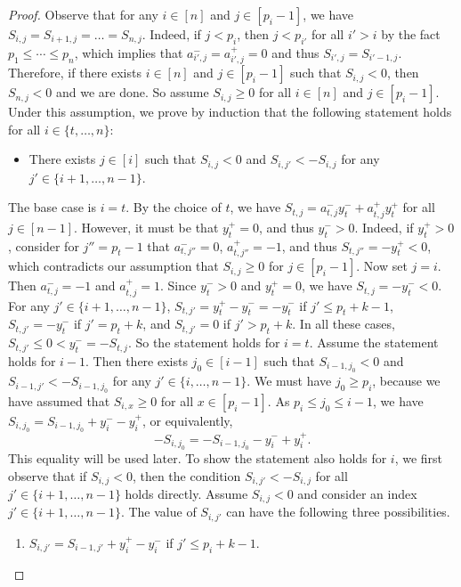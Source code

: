 \documentclass[english]{lipics-v2021}
\begin{document}
\begin{proof}
Observe that for any $i \in [n]$ and $j \in [p_i-1]$, we have $S_{i,j} = S_{i+1,j} = \dots = S_{n,j}$.
Indeed, if $j < p_i$, then $j < p_{i'}$ for all $i' > i$ by the fact $p_1 \leq \cdots \leq p_n$, which implies that $a_{i',j}^- = a_{i',j}^+ = 0$ and thus $S_{i',j} = S_{i'-1,j}$.
Therefore, if there exists $i \in [n]$ and $j \in [p_i-1]$ such that $S_{i,j} < 0$, then $S_{n,j} < 0$ and we are done.
So assume $S_{i,j} \geq 0$ for all $i \in [n]$ and $j \in [p_i-1]$.
Under this assumption, we prove by induction that the following statement holds for all $i \in \{t,\dots,n\}$:
\begin{itemize}
    \item There exists $j \in [i]$ such that $S_{i,j} < 0$ and $S_{i,j'} < - S_{i,j}$ for any $j' \in \{i+1,\dots,n-1\}$.
\end{itemize}
The base case is $i = t$.
By the choice of $t$, we have $S_{t,j} = a_{t,j}^- y_t^- + a_{t,j}^+ y_t^+$ for all $j \in [n-1]$.
However, it must be that $y_t^+ = 0$, and thus $y_t^- > 0$.
Indeed, if $y_t^+ > 0$, consider for $j'' = p_t-1$ that $a_{t,j''}^- = 0$, $a_{t,j''}^+ = -1$, and thus $S_{t,j''} = -y_t^+ < 0$, which contradicts our assumption that $S_{i,j} \geq 0$ for $j \in [p_i - 1]$.
Now set $j = i$.
Then $a_{t,j}^- = -1$ and $a_{t,j}^+ = 1$.
Since $y_t^- > 0$ and $y_t^+ = 0$, we have $S_{t,j} = -y_t^- < 0$.
For any $j' \in \{i+1,\dots,n-1\}$, $S_{t,j'} = y_t^+-y_t^- = -y_t^-$ if $j' \leq p_t+k-1$, $S_{t,j'} = -y_t^-$ if $j' = p_t+k$, and $S_{t,j'} = 0$ if $j' > p_t+k$.
In all these cases, $S_{t,j'} \leq 0 < y_t^- = -S_{t,j}$.
So the statement holds for $i = t$.
Assume the statement holds for $i-1$.
Then there exists $j_0 \in [i-1]$ such that $S_{i-1,j_0} < 0$ and $S_{i-1,j'} < - S_{i-1,j_0}$ for any $j' \in \{i,\dots,n-1\}$.
We must have $j_0 \geq p_i$, because we have assumed that $S_{i,x} \geq 0$ for all $x \in [p_i-1]$.
As $p_i \leq j_0 \leq i-1$, we have $S_{i,j_0} = S_{i-1,j_0} + y_i^- - y_i^+$, or equivalently,
\begin{equation} \label{eq-Sij0}
    -S_{i,j_0} = -S_{i-1,j_0} - y_i^- + y_i^+.
\end{equation}
This equality will be used later.
To show the statement also holds for $i$, we first observe that if $S_{i,j} < 0$, then the condition $S_{i,j'} < -S_{i,j}$ for all $j' \in \{i+1,\dots,n-1\}$ holds directly.
Assume $S_{i,j} < 0$ and consider an index $j' \in \{i+1,\dots,n-1\}$.
The value of $S_{i,j'}$ can have the following three possibilities.
\begin{enumerate}
    \item $S_{i,j'} = S_{i-1,j'} + y_i^+ - y_i^-$ if $j' \leq p_i+k-1$.

\end{enumerate}
\end{proof}
\end{document}
